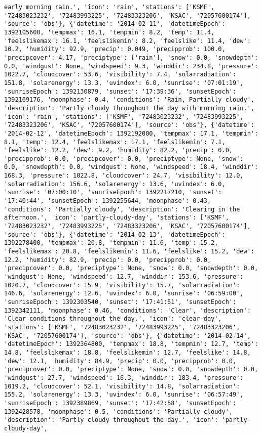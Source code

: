 \documentclass[
  letterpaper,
  DIV=11,
  numbers=noendperiod]{scrartcl}
\begin{document}
\begin{verbatim}
early morning rain.', 'icon': 'rain', 'stations': ['KSMF', '72483023232', '72483993225', '72483323206', 'KSAC', '72057600174'], 'source': 'obs'}, {'datetime': '2014-02-11', 'datetimeEpoch': 1392105600, 'tempmax': 16.1, 'tempmin': 8.2, 'temp': 11.4, 'feelslikemax': 16.1, 'feelslikemin': 8.2, 'feelslike': 11.4, 'dew': 10.2, 'humidity': 92.9, 'precip': 0.049, 'precipprob': 100.0, 'precipcover': 4.17, 'preciptype': ['rain'], 'snow': 0.0, 'snowdepth': 0.0, 'windgust': None, 'windspeed': 9.3, 'winddir': 234.8, 'pressure': 1022.7, 'cloudcover': 53.6, 'visibility': 7.4, 'solarradiation': 151.8, 'solarenergy': 13.3, 'uvindex': 6.0, 'sunrise': '07:01:19', 'sunriseEpoch': 1392130879, 'sunset': '17:39:36', 'sunsetEpoch': 1392169176, 'moonphase': 0.4, 'conditions': 'Rain, Partially cloudy', 'description': 'Partly cloudy throughout the day with morning rain.', 'icon': 'rain', 'stations': ['KSMF', '72483023232', '72483993225', '72483323206', 'KSAC', '72057600174'], 'source': 'obs'}, {'datetime': '2014-02-12', 'datetimeEpoch': 1392192000, 'tempmax': 17.1, 'tempmin': 8.1, 'temp': 12.4, 'feelslikemax': 17.1, 'feelslikemin': 7.1, 'feelslike': 12.2, 'dew': 9.2, 'humidity': 82.2, 'precip': 0.0, 'precipprob': 0.0, 'precipcover': 0.0, 'preciptype': None, 'snow': 0.0, 'snowdepth': 0.0, 'windgust': None, 'windspeed': 18.4, 'winddir': 168.3, 'pressure': 1022.8, 'cloudcover': 24.7, 'visibility': 12.0, 'solarradiation': 156.6, 'solarenergy': 13.6, 'uvindex': 6.0, 'sunrise': '07:00:10', 'sunriseEpoch': 1392217210, 'sunset': '17:40:44', 'sunsetEpoch': 1392255644, 'moonphase': 0.43, 'conditions': 'Partially cloudy', 'description': 'Clearing in the afternoon.', 'icon': 'partly-cloudy-day', 'stations': ['KSMF', '72483023232', '72483993225', '72483323206', 'KSAC', '72057600174'], 'source': 'obs'}, {'datetime': '2014-02-13', 'datetimeEpoch': 1392278400, 'tempmax': 20.8, 'tempmin': 11.6, 'temp': 15.2, 'feelslikemax': 20.8, 'feelslikemin': 11.6, 'feelslike': 15.2, 'dew': 12.2, 'humidity': 82.9, 'precip': 0.0, 'precipprob': 0.0, 'precipcover': 0.0, 'preciptype': None, 'snow': 0.0, 'snowdepth': 0.0, 'windgust': None, 'windspeed': 12.7, 'winddir': 153.6, 'pressure': 1020.7, 'cloudcover': 15.9, 'visibility': 15.7, 'solarradiation': 146.6, 'solarenergy': 12.6, 'uvindex': 6.0, 'sunrise': '06:59:00', 'sunriseEpoch': 1392303540, 'sunset': '17:41:51', 'sunsetEpoch': 1392342111, 'moonphase': 0.46, 'conditions': 'Clear', 'description': 'Clear conditions throughout the day.', 'icon': 'clear-day', 'stations': ['KSMF', '72483023232', '72483993225', '72483323206', 'KSAC', '72057600174'], 'source': 'obs'}, {'datetime': '2014-02-14', 'datetimeEpoch': 1392364800, 'tempmax': 18.8, 'tempmin': 12.7, 'temp': 14.8, 'feelslikemax': 18.8, 'feelslikemin': 12.7, 'feelslike': 14.8, 'dew': 12.1, 'humidity': 84.9, 'precip': 0.0, 'precipprob': 0.0, 'precipcover': 0.0, 'preciptype': None, 'snow': 0.0, 'snowdepth': 0.0, 'windgust': 27.7, 'windspeed': 16.3, 'winddir': 183.4, 'pressure': 1019.2, 'cloudcover': 52.1, 'visibility': 14.8, 'solarradiation': 155.2, 'solarenergy': 13.3, 'uvindex': 6.0, 'sunrise': '06:57:49', 'sunriseEpoch': 1392389869, 'sunset': '17:42:58', 'sunsetEpoch': 1392428578, 'moonphase': 0.5, 'conditions': 'Partially cloudy', 'description': 'Partly cloudy throughout the day.', 'icon': 'partly-cloudy-day', 
\end{verbatim}
\end{document}
